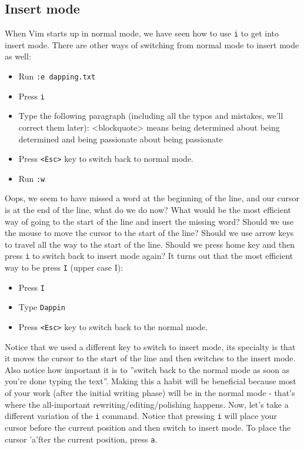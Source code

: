 \subsection{Insert mode}
When Vim starts up in normal mode,
we have seen how to use \texttt{i} to get into insert mode. There are other
ways of switching from normal mode to insert mode as well: 
\begin{itemize}
\item Run \texttt{:e dapping.txt} 
\item Press \texttt{i} 
\item Type the following paragraph (including all
the typos and mistakes, we'll correct them later): <blockquote> means being
determined about being determined and being passionate about being passionate
\item Press \texttt{<Esc>} key to switch back to normal mode. 
\item Run \texttt{:w} 
\end{itemize}
Oops, we seem to have missed a word at the beginning of the
line, and our cursor is at the end of the line, what do we do now? What would
be the most efficient way of going to the start of the line and insert the
missing word? Should we use the mouse to move the cursor to the start of the
line? Should we use arrow keys to travel all the way to the start of the line.
Should we press home key and then press \texttt{i} to switch back to insert
mode again? It turns out that the most efficient way to be press \texttt{I}
(upper case I): 
\begin{itemize}
\item Press \texttt{I} 
\item Type \texttt{Dappin} 
\item Press \texttt{<Esc>} key to switch back to the normal mode. 
\end{itemize}
Notice that we used a different key to switch to insert mode, its specialty is
that it moves the cursor to the start of the line and then switches to the
insert mode. Also notice how important it is to ''switch back to the normal
mode as soon as you're done typing the text''. Making this a habit will be
beneficial because most of your work (after the initial writing phase) will be
in the normal mode - that's where the all-important rewriting/editing/polishing
happens. Now, let's take a different variation of the \texttt{i} command.
Notice that pressing \texttt{i} will place your cursor before the current
position and then switch to insert mode. To place the cursor 'a'fter the
current position, press \texttt{a}. 
